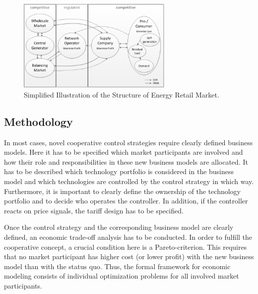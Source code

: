 \documentclass[a4paper,twoside]{article}
\begin{document}
\begin{figure}[t]
  \centering
  \includegraphics[width=75mm]{figures/market_structure.png}
  \caption{Simplified Illustration of the Structure of Energy Retail
    Market.}
  \label{fig:market_structure}
\end{figure}

\subsection{Methodology}
\label{sec:econ-2}
\noindent
In most cases, novel cooperative control strategies require clearly
defined business models. Here it has to be specified which market
participants are involved and how their role and responsibilities in
these new business models are allocated. It has to be described which
technology portfolio is considered in the business model and which
technologies are controlled by the control strategy in which
way. Furthermore, it is important to clearly define the ownership of
the technology portfolio
and to decide who operates the controller. 
In addition,
if the controller reacts on price signals, the tariff design has to be
specified.

Once the control strategy and the corresponding business model are
clearly defined, an economic trade-off analysis 
has to be conducted. In order to fulfill the cooperative
concept, a  crucial condition here is a Pareto-criterion. This
requires that no market participant has higher cost (or lower profit)
with the new business model
than with the status quo. Thus, the formal framework for economic
modeling consists of individual optimization problems for all
involved market participants. 
\end{document}
